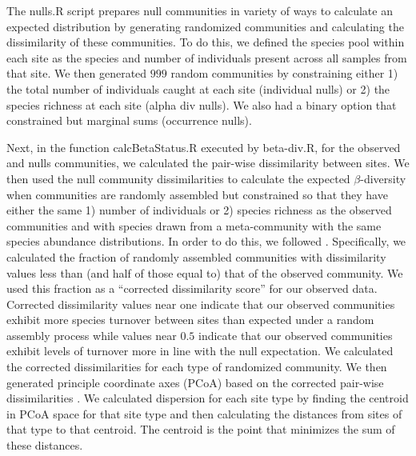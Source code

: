 \documentclass{article}\usepackage[]{graphicx}\usepackage[]{color}
\begin{document}
The nulls.R script prepares null communities in variety of ways to
calculate an expected distribution by generating randomized
communities and calculating the dissimilarity of these communities.
To do this, we defined the species pool within each site as the
species and number of individuals present across all samples from that
site.  We then generated $999$ random communities by constraining
either 1) the total number of individuals caught at each site
(individual nulls) or 2) the species richness at each site (alpha div
nulls). We also had a binary option that constrained but marginal
sums (occurrence nulls).


Next, in the function calcBetaStatus.R executed by beta-div.R, for the
observed and nulls communities, we calculated the pair-wise
dissimilarity between sites.  We then used the null community
dissimilarities to calculate the expected $\beta$-diversity when
communities are randomly assembled but constrained so that they have
either the same 1) number of individuals or 2) species richness as the
observed communities and with species drawn from a meta-community with
the same species abundance distributions.  In order to do this, we
followed \cite{chase-2011-art24}.  Specifically, we calculated the
fraction of randomly assembled communities with dissimilarity values
less than (and half of those equal to) that of the observed community.
We used this fraction as a ``corrected dissimilarity score'' for our
observed data.  Corrected dissimilarity values near one indicate that
our observed communities exhibit more species turnover between sites
than expected under a random assembly process while values near $0.5$
indicate that our observed communities exhibit levels of turnover more
in line with the null expectation. We calculated the corrected
dissimilarities for each type of randomized community. We then
generated principle coordinate axes (PCoA) based on the corrected
pair-wise dissimilarities \citep{oksanen-2013, anderson-2006-683,
anderson-2011-19, anderson-2006-245}.  We calculated dispersion for
each site type by finding the centroid in PCoA space for that site
type and then calculating the distances from sites of that type to
that centroid. The centroid is the point that minimizes the sum of
these distances.
\end{document}
